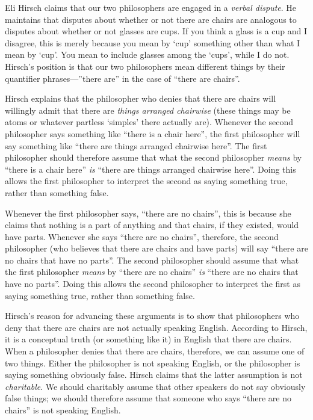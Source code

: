 \documentclass[11pt]{article}
\begin{document}
\begin{spacing}{1.25}
Eli Hirsch claims that our two philosophers are engaged in a {\em
  verbal dispute}.  He maintains that disputes about whether or not
there are chairs are analogous to disputes about whether or not
glasses are cups.  If you think a glass is a cup and I disagree, this
is merely because you mean by `cup' something other than what I mean
by `cup'.  You mean to include glasses among the `cups', while I do
not.  Hirsch's position is that our two philosophers mean different
things by their quantifier phrases---''there are'' in the case of
``there are chairs''.

Hirsch explains that the philosopher who denies that there are chairs
will willingly admit that there are {\em things arranged chairwise}
(these things may be atoms or whatever partless `simples' there
actually are).  Whenever the second philosopher says something like
``there is a chair here'', the first philosopher will say something
like ``there are things arranged chairwise here''.  The first
philosopher should therefore assume that what the second philosopher
{\em means} by ``there is a chair here'' {\em is} ``there are things
arranged chairwise here''.  Doing this allows the first philosopher to
interpret the second as saying something true, rather than something
false.

Whenever the first philosopher says, ``there are no chairs'', this is
because she claims that nothing is a part of anything and that chairs,
if they existed, would have parts.  Whenever she says ``there are no
chairs'', therefore, the second philosopher (who believes that there
are chairs and have parts) will say ``there are no chairs that have no
parts''.  The second philosopher should assume that what the first
philosopher {\em means} by ``there are no chairs'' {\em is} ``there
are no chairs that have no parts''.  Doing this allows the second
philosopher to interpret the first as saying something true, rather
than something false.

Hirsch's reason for advancing these arguments is to show that
philosophers who deny that there are chairs are not actually speaking
English.  According to Hirsch, it is a conceptual truth (or something
like it) in English that there are chairs.  When a philosopher denies
that there are chairs, therefore, we can assume one of two things.
Either the philosopher is not speaking English, or the philosopher is
saying something obviously false.  Hirsch claims that the latter
assumption is not {\em charitable}.  We should charitably assume that
other speakers do not say obviously false things; we should therefore
assume that someone who says ``there are no chairs'' is not speaking
English.


\end{spacing}
\end{document}
